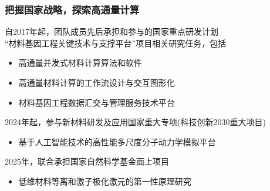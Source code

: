 \frame
{
	\frametitle{把握国家战略，探索高通量计算}
	自\textrm{2017}年起，团队成员先后承担和参与的国家重点研发计划\\
	{``材料基因工程关键技术与支撑平台''}项目相关研究任务，包括
\begin{itemize}
	\setlength{\itemsep}{3pt}
		\item {高通量并发式材料计算算法和软件}
		\item {高通量材料计算的工作流设计与交互图形化}
		\item {材料基因工程数据汇交与管理服务技术平台}
\end{itemize}
\textrm{2024}年起，参与新材料研发及应用国家重大专项\textrm{(科技创新2030重大项目)}
\begin{itemize}
	\item 基于人工智能技术的高性能多尺度分子动力学模拟平台
\end{itemize}
\textrm{2025}年，联合承担国家自然科学基金面上项目
\begin{itemize}
	\item 低维材料等离和激子极化激元的第一性原理研究
\end{itemize}
}

